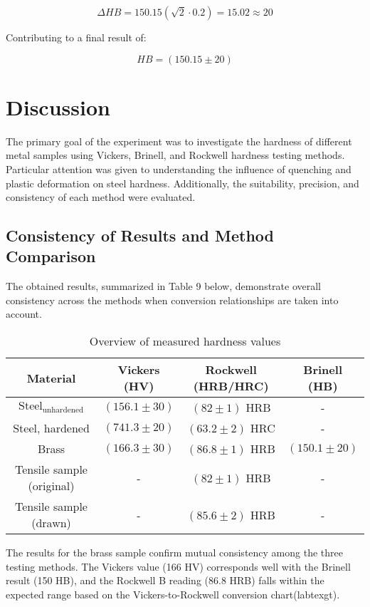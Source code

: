 \documentclass[a4paper]{article}
\begin{document}
\[\Delta HB = 150.15 (\sqrt{2} \cdot 0.2) = 15.02 \approx 20\]

Contributing to a final result of:

\[ HB = (150.15 \pm 20)\]

\section{Discussion}

The primary goal of the experiment was to investigate the hardness of different metal samples using Vickers, Brinell, and Rockwell hardness testing methods. Particular attention was given to understanding the influence of quenching and plastic deformation on steel hardness. Additionally, the suitability, precision, and consistency of each method were evaluated.

\subsection{Consistency of Results and Method Comparison}

The obtained results, summarized in Table 9 below, demonstrate overall
consistency across the methods when conversion relationships are taken into
account.

\begin{table}[!ht]
  \centering
  \label{tab:9}
  \caption{Overview of measured hardness values}
  \begin{tabular}{c|ccc}
  Material                  & Vickers (HV) & Rockwell (HRB/HRC) & Brinell (HB)  \\ 
  \hline
  $\mathrm{Steel_{unhardened}}$         & $(156.1 \pm 30)$   & $(82 \pm 1)$ HRB         & -             \\
  Steel, hardened           & $(741.3 \pm 20)$  & $(63.2 \pm 2)$ HRC       & -             \\
  Brass                     & $(166.3 \pm 30)$   & $(86.8 \pm 1)$ HRB       & $(150.1 \pm 20)$      \\
  Tensile sample (original) & -            & $(82 \pm 1)$ HRB         & -             \\
  Tensile sample (drawn)    & -            & $(85.6 \pm 2)$ HRB       & -            
  \end{tabular}
  \end{table}

  The results for the brass sample confirm mutual consistency among the three testing methods. The Vickers value (166 HV) corresponds well with the Brinell result (150 HB), and the Rockwell B reading (86.8 HRB) falls within the expected range based on the Vickers-to-Rockwell conversion chart(labtexgt).
\end{document}

